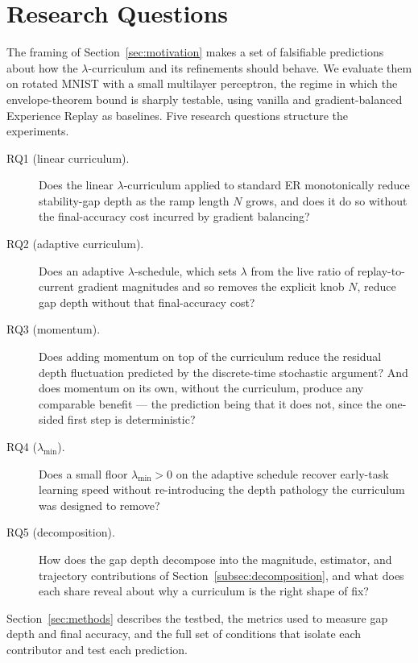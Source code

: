 \section{Research Questions}
\label{sec:proposed_approach}

The framing of Section~\ref{sec:motivation} makes a set of falsifiable predictions about how the $\lambda$-curriculum and its refinements should behave. We evaluate them on rotated MNIST with a small multilayer perceptron, the regime in which the envelope-theorem bound is sharply testable, using vanilla and gradient-balanced Experience Replay as baselines. Five research questions structure the experiments.

\begin{description}
    \item[RQ1 (linear curriculum).] Does the linear $\lambda$-curriculum applied to standard ER monotonically reduce stability-gap depth as the ramp length $N$ grows, and does it do so without the final-accuracy cost incurred by gradient balancing?

    \item[RQ2 (adaptive curriculum).] Does an adaptive $\lambda$-schedule, which sets $\lambda$ from the live ratio of replay-to-current gradient magnitudes and so removes the explicit knob $N$, reduce gap depth without that final-accuracy cost?

    \item[RQ3 (momentum).] Does adding momentum on top of the curriculum reduce the residual depth fluctuation predicted by the discrete-time stochastic argument? And does momentum on its own, without the curriculum, produce any comparable benefit --- the prediction being that it does not, since the one-sided first step is deterministic?

    \item[RQ4 ($\lambda_{\min}$).] Does a small floor $\lambda_{\min} > 0$ on the adaptive schedule recover early-task learning speed without re-introducing the depth pathology the curriculum was designed to remove?

    \item[RQ5 (decomposition).] How does the gap depth decompose into the magnitude, estimator, and trajectory contributions of Section~\ref{subsec:decomposition}, and what does each share reveal about why a curriculum is the right shape of fix?
\end{description}

Section~\ref{sec:methods} describes the testbed, the metrics used to measure gap depth and final accuracy, and the full set of conditions that isolate each contributor and test each prediction.
